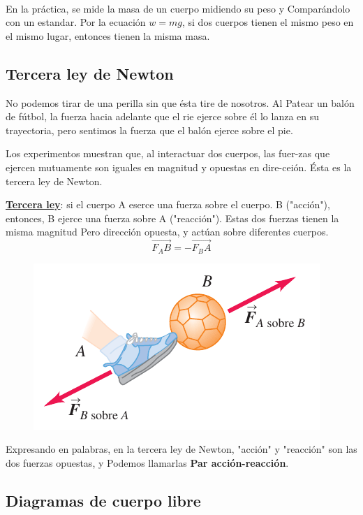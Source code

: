 \documentclass{article}
\newcommand{\newsubsection}[1]{
    \subsection{\color{sectionColor} #1}
}
\newcommand{\newtitle}[1]{
    \vspace{0.5cm}
    \noindent{\large \color{titleColor} \textbf{#1}}\\[0.2cm]
}
\newcommand{\bl}[1]{\textbf{#1}}
\newcommand{\definicion}[1]{%
    \begin{definicionbox}
        #1
    \end{definicionbox}
}
\begin{document}
    \newtitle{Medición de masa y peso}

    \par En la práctica, se mide la masa de un cuerpo midiendo su peso y Comparándolo con un estandar. Por la ecuación $w=mg$, si dos cuerpos tienen el mismo peso en el mismo lugar, entonces tienen la misma masa.

    \newsubsection{Tercera ley de Newton}

    \par No podemos tirar de una perilla sin que ésta tire de nosotros. Al Patear un balón de fútbol, la fuerza hacia adelante que el rie ejerce sobre él lo lanza en su trayectoria, pero sentimos la fuerza que el balón ejerce sobre el pie.
    \par Los experimentos muestran que, al interactuar dos cuerpos, las fuer-zas que ejercen mutuamente son iguales en magnitud y opuestas en dire-ceión. Ésta es la tercera ley de Newton.

    \definicion{
        \par \color{blue}\underline{\bl{Tercera ley}}\color{black}: si el cuerpo A eserce una fuerza sobre el cuerpo. B ("acción"), entonces, B ejerce una fuerza sobre A ("reacción"). Estas dos fuerzas tienen la misma magnitud Pero dirección opuesta, y actúan sobre diferentes cuerpos.
        \[\vec{F_AB} = - \vec{F_BA}\]
    }

    \begin{figure}[H]
        \centering
        \includegraphics[scale=0.8]{img/2.5-1.png}
    \end{figure}

    \par Expresando en palabras, en la tercera ley de Newton, "acción" y "reacción" son las dos fuerzas opuestas, y Podemos llamarlas \bl{Par acción-reacción}.

    \newsubsection{Diagramas de cuerpo libre}
\end{document}
